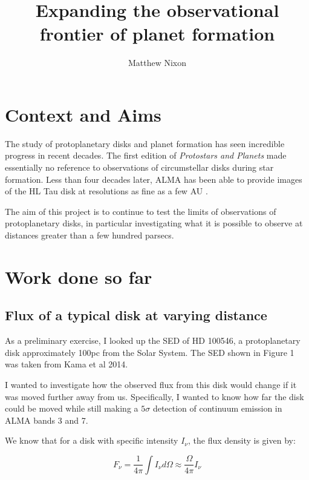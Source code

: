 \documentclass[a4paper,fleqn,usenatbib]{mnras}
\title[Observations of planet formation]{Expanding the observational frontier of planet formation}
\author[M. Nixon]{
Matthew Nixon
}
\begin{document}
\label{firstpage}
\pagerange{\pageref{firstpage}--\pageref{lastpage}}
\maketitle



\section{Context and Aims}

The study of protoplanetary disks and planet formation has seen incredible progress in recent decades. The first edition of \textit{Protostars and Planets} \citet{Gehrels1978} made essentially no reference to observations of circumstellar disks during star formation. Less than four decades later, ALMA has been able to provide images of the HL Tau disk at resolutions as fine as a few AU \citet{Broganetal2015}.

The aim of this project is to continue to test the limits of observations of protoplanetary disks, in particular investigating what it is possible to observe at distances greater than a few hundred parsecs.

\section{Work done so far}

\subsection{Flux of a typical disk at varying distance}

As a preliminary exercise, I looked up the SED of HD 100546, a protoplanetary disk approximately 100pc from the Solar System. The SED shown in Figure 1 was taken from Kama et al 2014.

I wanted to investigate how the observed flux from this disk would change if it was moved further away from us. Specifically, I wanted to know how far the disk could be moved while still making a $5\sigma$ detection of continuum emission in ALMA bands 3 and 7.

We know that for a disk with specific intensity $I_{\nu}$, the flux density is given by:

\begin{equation}
  F_{\nu} = \frac{1}{4\pi}\int I_{\nu} d\Omega \approx \frac{\Omega}{4\pi}I_{\nu}
  \label{eq:flux}
\end{equation}
\end{document}
